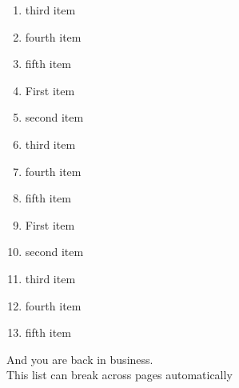 \documentclass[12pt,a4paper]{article}
\begin{document}
\begin{Parallel}[v]{0.48\textwidth}{0.48\textwidth}
{\begin{enumerate}[itemsep=1ex,leftmargin=1cm,rightmargin=.52\textwidth]
  \item{third item}
  \item{fourth item}
  \item{fifth item}
    \item { First item}
  \item{second item}
  \item{third item}
  \item{fourth item}
  \item{fifth item}
  \item { First item}
  \item{second item}
  \item{third item}
  \item{fourth item}
  \item{fifth item}
\end{enumerate}
And you are back in business.\\
This list can break across pages automatically }
\ParallelPar
\end{Parallel}
\end{document}
